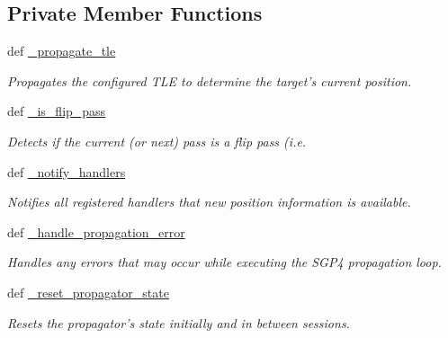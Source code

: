 \subsection*{Private Member Functions}
\begin{DoxyCompactItemize}
\item 
def \hyperlink{classhwm_1_1hardware_1_1devices_1_1drivers_1_1sgp4__tracker_1_1sgp4__tracker_1_1_s_g_p4_propagation_service_afcfffeb568845a241cc0b89c032289e4}{\-\_\-propagate\-\_\-tle}
\begin{DoxyCompactList}\small\item\em Propagates the configured T\-L\-E to determine the target's current position. \end{DoxyCompactList}\item 
def \hyperlink{classhwm_1_1hardware_1_1devices_1_1drivers_1_1sgp4__tracker_1_1sgp4__tracker_1_1_s_g_p4_propagation_service_aed19e238a58dfced328c3cdd961387c1}{\-\_\-is\-\_\-flip\-\_\-pass}
\begin{DoxyCompactList}\small\item\em Detects if the current (or next) pass is a flip pass (i.\-e. \end{DoxyCompactList}\item 
def \hyperlink{classhwm_1_1hardware_1_1devices_1_1drivers_1_1sgp4__tracker_1_1sgp4__tracker_1_1_s_g_p4_propagation_service_aad212a39d618326af260e1b97fad6d93}{\-\_\-notify\-\_\-handlers}
\begin{DoxyCompactList}\small\item\em Notifies all registered handlers that new position information is available. \end{DoxyCompactList}\item 
def \hyperlink{classhwm_1_1hardware_1_1devices_1_1drivers_1_1sgp4__tracker_1_1sgp4__tracker_1_1_s_g_p4_propagation_service_ab87cddee9fc99bb1e3cf59986b13716e}{\-\_\-handle\-\_\-propagation\-\_\-error}
\begin{DoxyCompactList}\small\item\em Handles any errors that may occur while executing the S\-G\-P4 propagation loop. \end{DoxyCompactList}\item 
def \hyperlink{classhwm_1_1hardware_1_1devices_1_1drivers_1_1sgp4__tracker_1_1sgp4__tracker_1_1_s_g_p4_propagation_service_a63bbc3f61c575abaf94d6c3bf1001432}{\-\_\-reset\-\_\-propagator\-\_\-state}
\begin{DoxyCompactList}\small\item\em Resets the propagator's state initially and in between sessions. \end{DoxyCompactList}\end{DoxyCompactItemize}
